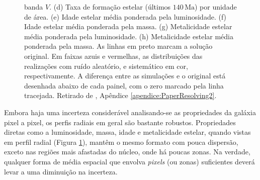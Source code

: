\begin{figure}
{	banda $V$. (d) Taxa de formação estelar (últimos $140\, \mathrm{Ma}$) por
	unidade de área. (e) Idade estelar média ponderada pela luminosidade. (f) Idade
	estelar média ponderada pela massa. (g) Metalicidade estelar média ponderada
	pela luminosidade. (h) Metalicidade estelar média ponderada pela massa. As
	linhas em preto marcam a solução original. Em faixas azuis e vermelhas, as
	distribuições das realizações com ruído aleatório, e sistemático em cor,
	respectivamente. A diferença entre as simulações e o original está desenhada
	abaixo de cada painel, com o zero marcado pela linha tracejada. Retirado de
	\citet[figura 4]{CidFernandes2014}, Apêndice \ref{apendice:PaperResolving2}.}
	\label{fig:incertRad}
\end{figure}

Embora haja uma incerteza considerável analisando-se as propriedades da galáxia
pixel a pixel, os perfis radiais em geral são bastante robustos. Propriedades
diretas como a luminosidade, massa, idade e metalicidade estelar, quando vistas
em perfil radial (Figura \ref{fig:incertRad}), mantêm o mesmo formato com pouca
dispersão, exceto nas regiões mais afastadas do núcleo, onde há poucas zonas. Na
verdade, qualquer forma de média espacial que envolva {\em pixels} (ou zonas)
suficientes deverá levar a uma diminuição na incerteza.

